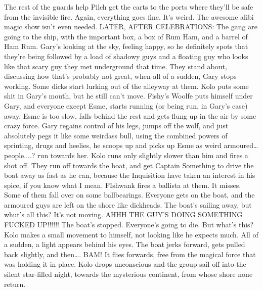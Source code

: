 The rest of the guards help Pilch get the carts to the ports where they’ll be safe from the invisible fire.\medskip
Again, everything goes fine. It’s weird.\medskip
The awesome alibi magic show isn’t even needed.\medskip
LATER, AFTER CELEBRATIONS:\medskip
The gang are going to the ship, with the important box, a box of Rum Ham, and a barrel of Ham Rum.\medskip
Gary’s looking at the sky, feeling happy, so he definitely spots that they’re being followed by a load of shadowy guys and a floating guy who looks like that scary guy they met underground that time.\medskip
They stand about, discussing how that’s probably not great, when all of a sudden, Gary stops working. Some dicks start lurking out of the alleyway at them. Kolo puts some shit in Gary’s mouth, but he still can’t move.\medskip
Fishy’s Woolfe puts himself under Gary, and everyone except Esme, starts running (or being run, in Gary’s case) away.\medskip
Esme is too slow, falls behind the rest and gets flung up in the air by some crazy force.\medskip
Gary regains control of his legs, jumps off the wolf, and just absolutely pegs it like some weirdass bull, using the combined powers of sprinting, drugs and heelies, he scoops up and picks up Esme as weird armoured… people....? run towards her. Kolo runs only slightly slower than him and fires a shot off.\medskip
They run off towards the boat, and get Captain Something to drive the boat away as fast as he can, because the Inquisition have taken an interest in his spice, if you know what I mean.\medskip
FIshwank fires a ballista at them. It misses.\medskip
Some of them fall over on some ballbearings.\medskip
Everyone gets on the boat, and the armoured guys are left on the shore like dickheads.\medskip
The boat’s sailing away, but whut’s all this? It’s not moving.\medskip
AHHH THE GUY’S DOING SOMETHING FUCKED UP!!!!!!\medskip
The boat’s stopped. Everyone’s going to die.\medskip
But what’s this?\medskip
Kolo makes a small movement to himself, not looking like he expects much. All of a sudden, a light appears behind his eyes. The boat jerks forward, gets pulled back slightly, and then…. BAM! It flies forwards, free from the magical force that was holding it in place.\medskip
Kolo drops unconscious and the group sail off into the silent star-filled night, towards the mysterious continent, from whose shore none return.